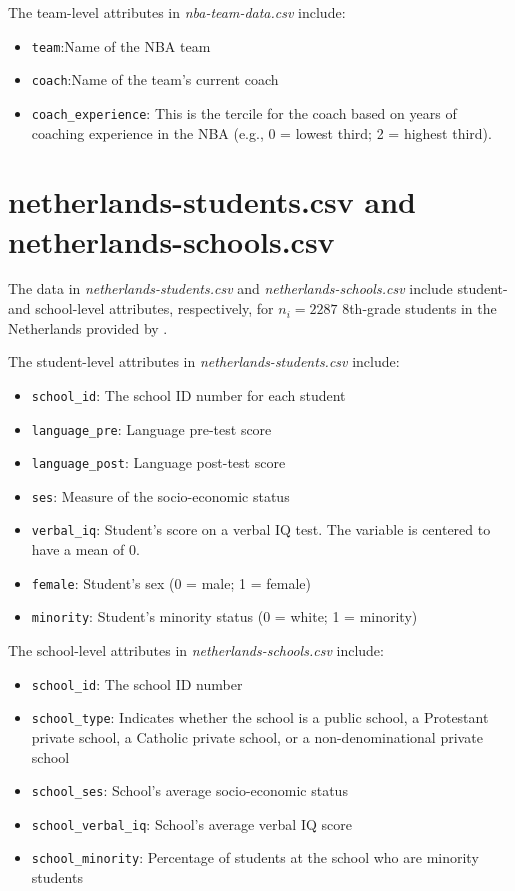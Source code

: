 \documentclass[]{book}
\providecommand{\tightlist}{%
  \setlength{\itemsep}{0pt}\setlength{\parskip}{0pt}}
\begin{document}
The team-level attributes in \emph{nba-team-data.csv} include:

\begin{itemize}
\tightlist
\item
  \texttt{team}:Name of the NBA team
\item
  \texttt{coach}:Name of the team's current coach
\item
  \texttt{coach\_experience}: This is the tercile for the coach based on years of coaching experience in the NBA (e.g., 0 = lowest third; 2 = highest third).
\end{itemize}

\hypertarget{netherlands}{%
\section*{netherlands-students.csv and netherlands-schools.csv}\label{netherlands}}

The data in \emph{netherlands-students.csv} and \emph{netherlands-schools.csv} include student- and school-level attributes, respectively, for \(n_i=2287\) 8th-grade students in the Netherlands provided by \citet{Snijders:2012}.

The student-level attributes in \emph{netherlands-students.csv} include:

\begin{itemize}
\tightlist
\item
  \texttt{school\_id}: The school ID number for each student
\item
  \texttt{language\_pre}: Language pre-test score
\item
  \texttt{language\_post}: Language post-test score
\item
  \texttt{ses}: Measure of the socio-economic status
\item
  \texttt{verbal\_iq}: Student's score on a verbal IQ test. The variable is centered to have a mean of 0.
\item
  \texttt{female}: Student's sex (0 = male; 1 = female)
\item
  \texttt{minority}: Student's minority status (0 = white; 1 = minority)
\end{itemize}

The school-level attributes in \emph{netherlands-schools.csv} include:

\begin{itemize}
\tightlist
\item
  \texttt{school\_id}: The school ID number
\item
  \texttt{school\_type}: Indicates whether the school is a public school, a Protestant private school, a Catholic private school, or a non-denominational private school
\item
  \texttt{school\_ses}: School's average socio-economic status
\item
  \texttt{school\_verbal\_iq}: School's average verbal IQ score
\item
  \texttt{school\_minority}: Percentage of students at the school who are minority students
\end{itemize}
\end{document}
